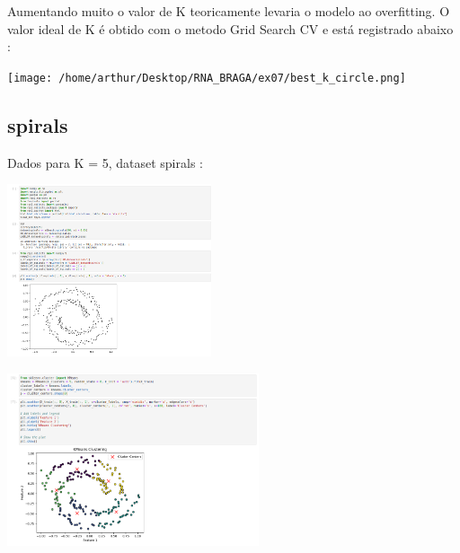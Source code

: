 \documentclass{article}
\begin{document}
Aumentando muito o valor de K teoricamente levaria o modelo ao overfitting. O valor ideal de K é obtido com o metodo Grid Search CV e está registrado abaixo : 

\vspace{10pt}

\begin{center}

\texttt{[image: /home/arthur/Desktop/RNA\_BRAGA/ex07/best\_k\_circle.png]}
                
\end{center}



\vspace{20pt}



\subsection{spirals}

\vspace{10pt}

Dados para K = 5, dataset spirals : 

\vspace{10pt}

\begin{center}

\includegraphics[height=2in]{spirals_data.png}
    
\end{center}

\vspace{10pt}

\begin{center}

\includegraphics[height=2in]{spirals_cluster.png}
        
\end{center}
\end{document}
